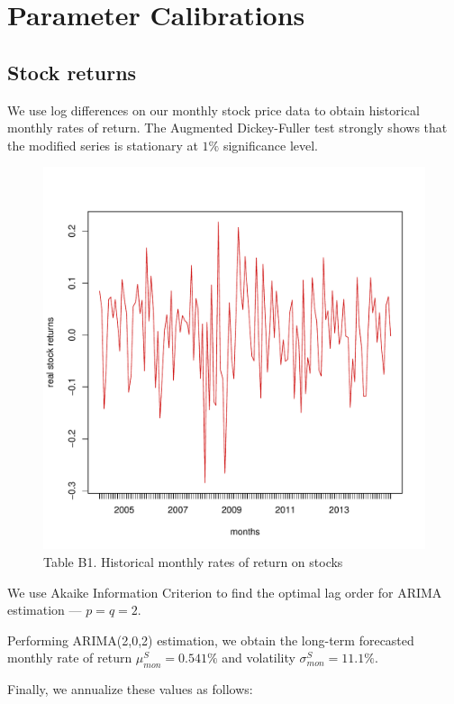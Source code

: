 \chapter{Parameter Calibrations}
\label{paramcalib}

\section{Stock returns}
\label{paramcalibx}
We use log differences on our monthly stock price data to obtain historical monthly rates of return. The Augmented Dickey-Fuller test strongly shows that the modified series is stationary at $1\%$ significance level.

\begin{figure}[h!]
	\centering
	\includegraphics[scale=0.3]{figs/bistdiff.pdf}
	\caption*{Table B1. Historical monthly rates of return on stocks}
	\label{fig:bistdiff}
\end{figure}

We use Akaike Information Criterion to find the optimal lag order for ARIMA estimation --- $p=q=2$.

Performing ARIMA(2,0,2) estimation, we obtain the long-term forecasted monthly rate of return $\mu^S_{mon} = 0.541\%$ and volatility $\sigma^S_{mon} = 11.1\%$.

Finally, we annualize these values as follows:

